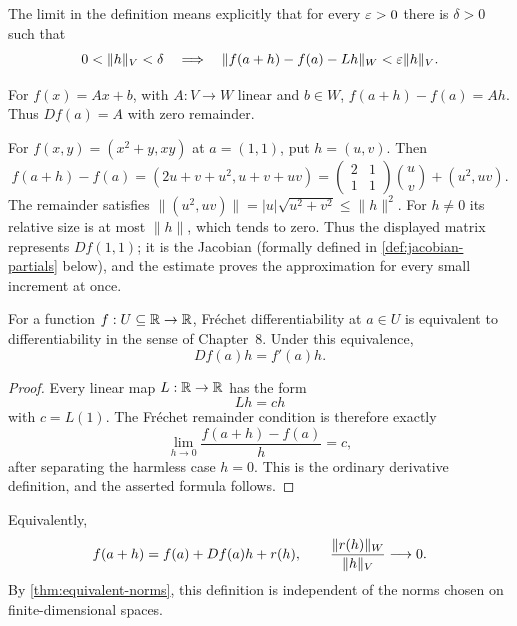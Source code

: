 The limit in the definition means explicitly that for every $\varepsilon>0$
there is $\delta>0$ such that
\[
0<\|h\|_V<\delta\quad\Longrightarrow\quad
\|f(a+h)-f(a)-Lh\|_W<\varepsilon\|h\|_V.
\]
\begin{example}
For $f(x)=Ax+b$, with $A:V\to W$ linear and $b\in W$,
$f(a+h)-f(a)=Ah$. Thus $Df(a)=A$ with zero remainder.
\end{example}

\begin{example}
For $f(x,y)=(x^2+y,xy)$ at $a=(1,1)$, put $h=(u,v)$. Then
\[
f(a+h)-f(a)=(2u+v+u^2,u+v+uv)
=\begin{pmatrix}2&1\\1&1\end{pmatrix}\binom{u}{v}+(u^2,uv).
\]
The remainder satisfies $\|(u^2,uv)\|=|u|\sqrt{u^2+v^2}\leq\|h\|^2$.
For $h\ne0$ its relative size is at most $\|h\|$, which tends to zero.
Thus the displayed matrix represents $Df(1,1)$; it is the Jacobian
(formally defined in \cref{def:jacobian-partials} below), and
the estimate proves the approximation for every small increment at once.
\end{example}

\begin{proposition}
\label{prop:frechet-one-dimensional}
For a function \(f:U\subseteq\mathbb{R}\to\mathbb{R}\), Fr\'echet differentiability at
\(a\in U\) is equivalent to differentiability in the sense of Chapter~8.
Under this equivalence,
\[
Df(a)h=f'(a)h.
\]
\end{proposition}
\begin{proof}
Every linear map \(L:\mathbb{R}\to\mathbb{R}\) has the form
\[
Lh=ch
\]
with \(c=L(1)\).  The Fr\'echet remainder condition is therefore exactly
\[
\lim_{h\to0}\frac{f(a+h)-f(a)}{h}=c,
\]
after separating the harmless case \(h=0\).  This is the ordinary derivative
definition, and the asserted formula follows.
\end{proof}

\begin{remark}
Equivalently,
\[
f(a+h)=f(a)+Df(a)h+r(h),
\qquad
\frac{\lVert r(h)\rVert_W}{\lVert h\rVert_V}\longrightarrow0.
\]
By \cref{thm:equivalent-norms}, this definition is independent of the norms
chosen on finite-dimensional spaces.
\end{remark}

